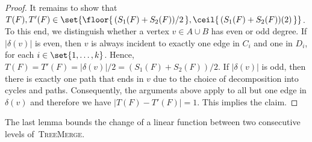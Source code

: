 \documentclass[a4paper,USenglish,cleveref,thm-restate]{lipics-v2021}
\begin{document}
\begin{proof}
    It remains to show that~$T(F), T'(F) \in \set{\floor{\,(S_1(F) + S_2(F))/2\,}, \ceil{\,(S_1(F) + S_2(F))(2)\,}}$.
    To this end, we distinguish whether a vertex $v \in A \cup B$ has even or odd degree. If $|\delta(v)|$ is even, then $v$ is always incident to exactly one edge in $C_i$ and one in $D_i$, for each $i\in\set{1,\dotsc,k}$.
    Hence, $T(F) = T'(F) = |\delta(v)| / 2 = (S_1(F) + S_2(F))/2$.
    If $|\delta(v)|$ is odd, then there is exactly one path that ends in $v$ due to the choice of decomposition into cycles and paths. 
    Consequently, the arguments above apply to all but one edge in $\delta(v)$ and therefore we have $|T(F) - T'(F)| = 1$. 
    This implies the claim.
\end{proof}

The last lemma bounds the change of a linear function between two consecutive levels of~\textsc{TreeMerge}.

\IncreaseOfLinearFunction*
\end{document}
